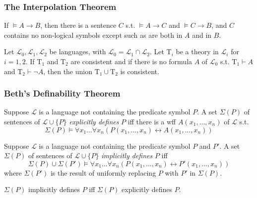 \documentclass[UTF8,11pt,colorlinks,compress,openany]{beamer}%
\begin{document}
\begin{frame}\frametitle{The Interpolation Theorem}
	\begin{theorem}
		If $\vDash A\to B$, then there is a
		sentence $C$ s.t. $\vDash A\to C$ and $\vDash C\to B$, and $C$ contains no non-logical symbols except such as are both in $A$ and in $B$.
	\end{theorem}
	\begin{theorem}
		Let $\mathscr{L}_0,\mathscr{L}_1,\mathscr{L}_2$ be languages, with $\mathscr{L}_0=\mathscr{L}_1\cap \mathscr{L}_2$. Let $\mathrm{T}_i$ be a theory in $\mathscr{L}_i$ for $i=1,2$. If $\mathrm{T}_1$ and $\mathrm{T}_2$ are consistent and if there is no formula $A$ of $\mathscr{L}_0$ s.t. $\mathrm{T}_1\vdash A$ and $\mathrm{T}_2\vdash\neg A$, then the union $\mathrm{T}_1\cup \mathrm{T}_2$ is consistent.
	\end{theorem}
\end{frame}

\begin{frame}\frametitle{Beth's Definability Theorem}
\setlength\abovedisplayskip{0pt}
\setlength\belowdisplayskip{0pt}
	\begin{definition}
		Suppose $\mathscr{L}$ is a language not containing the predicate symbol $P$. A set $\Sigma(P)$ of sentences of $\mathscr{L}\cup\{P\}$ \emph{explicitly defines} $P$ iff there is a wff $A(x_1,\dots,x_n)$ of $\mathscr{L}$ s.t.
		\[\Sigma(P)\vDash\forall x_1\dots\forall x_n(P(x_1,\dots,x_n)\leftrightarrow A(x_1,\dots,x_n))\]
	\end{definition}
	\begin{definition}
		Suppose $\mathscr{L}$ is a language not containing the predicate symbol $P$ and $P'$. A set $\Sigma(P)$ of sentences of $\mathscr{L}\cup\{P\}$ \emph{implicitly defines} $P$ iff
		\[\Sigma(P)\cup\Sigma(P')\vDash\forall x_1\dots\forall x_n(P(x_1,\dots,x_n)\leftrightarrow P'(x_1,\dots,x_n))\]
		where $\Sigma(P')$ is the result of uniformly replacing $P$ with $P'$ in $\Sigma(P)$.
	\end{definition}
	\begin{theorem}
		$\Sigma(P)$ implicitly defines $P$ iff $\Sigma(P)$ explicitly defines $P$.
	\end{theorem}
	\centerline{}
\end{frame}
\end{document}
